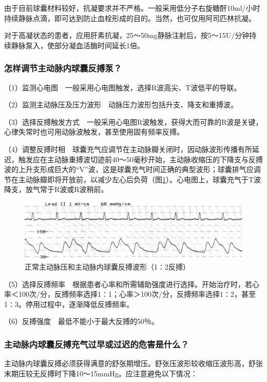 由于目前球囊材料较好，抗凝要求并不严格。一般采用低分子右旋糖酐10ml/小时持续静脉点滴，即可达到防止血栓形成的目的。当然，也可仅用阿司匹林抗凝。

对于高凝状态的患者，应用肝素抗凝，25～50mg静脉注射后，按5～15U/分钟持续静脉泵入，使部分凝血活酶时间延长1倍。

\subsubsection{怎样调节主动脉内球囊反搏泵？}

（1）监测心电图　一般采用心电图触发，选择R波高尖、T波低平的导联。

（2）监测主动脉压及压力波形　动脉压力波形包括升支、降支和重搏波。

（3）选择反搏触发方式　一般采用心电图R波触发，获得大而可靠的R波是关键，心律失常时也可用动脉波触发，甚至使用固有频率反搏。

（4）调整反搏时相　球囊充气应调节在主动脉瓣关闭时，因动脉波形传播有所延迟，触发应在主动脉重搏波切迹前40～50毫秒开始，主动脉收缩压的下降支与反搏波的上升支形成巨大的“V”波，这是球囊充气时间正确的典型波形；球囊排气应调节在主动脉瓣即将开放前，以减少左心后负荷（图\ref{fig2-4}）。心电图上，球囊充气于T波降支，放气常于R波或R波稍前。

\begin{figure}[!htbp]
 \centering
 \includegraphics{./images/Image00023.jpg}
 \captionsetup{justification=centering}
 \caption{正常主动脉压和主动脉内球囊反搏波形（1∶2反搏）}
 \label{fig2-4}
  \end{figure} 

（5）选择反搏频率　根据患者心率和所需辅助强度进行选择。开始治疗时，若心率＜100次/分，反搏频率选择1∶1；心率＞100次/分，反搏频率选择1∶2，甚至1∶3。停用过程中，逐渐降低反搏频率。

（6）反搏强度　最低不能小于最大反搏的50％。

\subsubsection{主动脉内球囊反搏充气过早或过迟的危害是什么？}

主动脉内球囊反搏必须获得满意的舒张期增压。舒张压波形较收缩压波形高，舒张末期压较无反搏时下降10～15mmHg。应注意避免以下情况：

